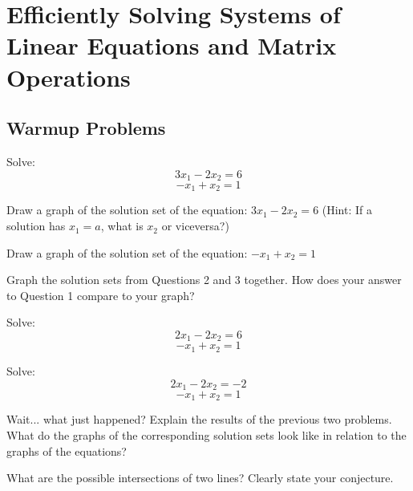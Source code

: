 \mainmatter

\chapter{Efficiently Solving Systems of Linear Equations and Matrix Operations}



\section{Warmup Problems}
\begin{annotation}
\end{annotation}
\begin{question} Solve:
$$ 3x_1-2x_2=6 $$
$$-x_1+x_2=1 $$
\end{question}

\begin{question} Draw a graph of the solution set of the equation: $3x_1-2x_2=6$ (Hint: If a solution has $x_1=a$, what is $x_2$ or viceversa?)
\end{question}

\begin{question} Draw a graph of the solution set of the equation: $-x_1+x_2=1$
\end{question}

\begin{question}\label{q2} Graph the solution sets from Questions 2 and 3 together. How does your answer to Question 1 compare to your graph?
\end{question}

\begin{question} Solve:
$$ 2x_1-2x_2=6 $$
$$-x_1+x_2=1 $$
\end{question}

\begin{question} Solve:
$$ 2x_1-2x_2=-2 $$
$$-x_1+x_2=1 $$
\end{question}

\begin{question} Wait... what just happened? Explain the results of the previous two problems. What do the graphs of the corresponding solution sets look like in relation to the graphs of the equations?
\end{question}

\begin{question} What are the possible intersections of two lines? Clearly state your conjecture.
\end{question}

